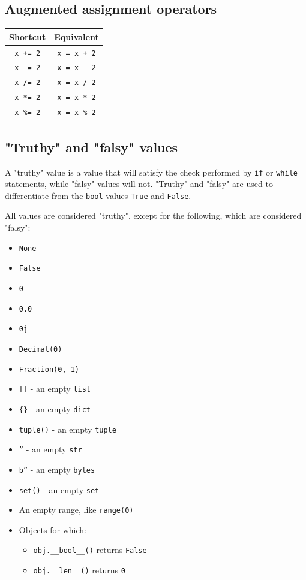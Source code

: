 \documentclass[11pt]{article}
\begin{document}
\subsection{Augmented assignment operators}
\label{sec:orgaa1b199}

\begin{center}
\begin{tabular}{c|c}
Shortcut & Equivalent\\[0pt]
\hline
\texttt{x += 2} & \texttt{x = x + 2}\\[0pt]
\texttt{x -= 2} & \texttt{x = x - 2}\\[0pt]
\texttt{x /= 2} & \texttt{x = x / 2}\\[0pt]
\texttt{x *= 2} & \texttt{x = x * 2}\\[0pt]
\texttt{x \%= 2} & \texttt{x = x \% 2}\\[0pt]
\end{tabular}
\end{center}

 \newpage

\subsection{"Truthy" and "falsy" values}
\label{sec:org7f42c8e}
\label{org885cbd7}
A "truthy" value is a value that will satisfy the check performed by \texttt{if} or \texttt{while} statements, while "falsy" values will not. "Truthy" and "falsy" are used to differentiate from the \texttt{bool} values \texttt{True} and \texttt{False}.

 \noindent All values are considered "truthy", except for the following, which are considered "falsy":
\begin{itemize}
\item \texttt{None}
\item \texttt{False}
\item \texttt{0}
\item \texttt{0.0}
\item \texttt{0j}
\item \texttt{Decimal(0)}
\item \texttt{Fraction(0, 1)}
\item \texttt{[]} - an empty \texttt{list}
\item \texttt{\{\}} - an empty \texttt{dict}
\item \texttt{tuple()} - an empty \texttt{tuple}
\item \texttt{''} - an empty \texttt{str}
\item \texttt{b''} - an empty \texttt{bytes}
\item \texttt{set()} - an empty \texttt{set}
\item An empty range, like \texttt{range(0)}
\item Objects for which:
\begin{itemize}
\item \texttt{obj.\_\_bool\_\_()} returns \texttt{False}
\item \texttt{obj.\_\_len\_\_()} returns \texttt{0}
\end{itemize}
\end{itemize}
\end{document}
